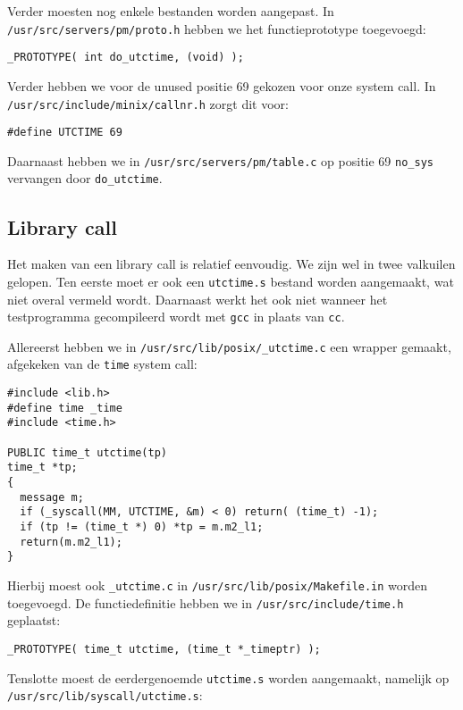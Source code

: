 \documentclass[11pt]{article}
\begin{document}
Verder moesten nog enkele bestanden worden aangepast. In \verb+/usr/src/servers/pm/proto.h+ hebben
we het functieprototype toegevoegd:

\begin{verbatim}
_PROTOTYPE( int do_utctime, (void) );
\end{verbatim}

Verder hebben we voor de unused positie 69 gekozen voor onze system call. In \verb+/usr/src/include/minix/callnr.h+
zorgt dit voor:

\begin{verbatim}
#define UTCTIME 69
\end{verbatim}

Daarnaast hebben we in \verb+/usr/src/servers/pm/table.c+ op positie 69 \verb+no_sys+ vervangen
door \verb+do_utctime+.

\subsection*{Library call}

Het maken van een library call is relatief eenvoudig. We zijn wel in twee valkuilen gelopen. Ten eerste
moet er ook een \verb+utctime.s+ bestand worden aangemaakt, wat niet overal vermeld wordt. Daarnaast
werkt het ook niet wanneer het testprogramma gecompileerd wordt met \verb+gcc+ in plaats van \verb+cc+.

Allereerst hebben we in \verb+/usr/src/lib/posix/_utctime.c+ een wrapper gemaakt, afgekeken van de
\verb+time+ system call:

\begin{verbatim}
#include <lib.h>
#define time _time
#include <time.h>

PUBLIC time_t utctime(tp)
time_t *tp;
{
  message m;
  if (_syscall(MM, UTCTIME, &m) < 0) return( (time_t) -1);
  if (tp != (time_t *) 0) *tp = m.m2_l1;
  return(m.m2_l1);
}
\end{verbatim}

Hierbij moest ook \verb+_utctime.c+ in \verb+/usr/src/lib/posix/Makefile.in+ worden toegevoegd.
De functiedefinitie hebben we in \verb+/usr/src/include/time.h+ geplaatst:

\begin{verbatim}
_PROTOTYPE( time_t utctime, (time_t *_timeptr) );
\end{verbatim}

Tenslotte moest de eerdergenoemde \verb+utctime.s+ worden aangemaakt, namelijk op
\verb+/usr/src/lib/syscall/utctime.s+:
\end{document}
